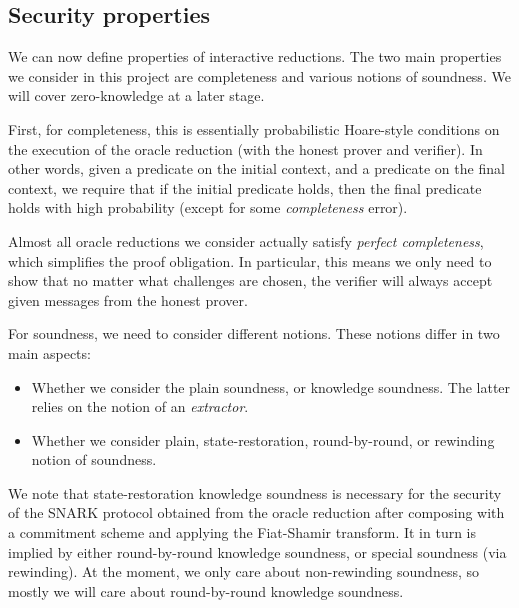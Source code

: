 \subsection{Security properties}

We can now define properties of interactive reductions. The two main properties we consider in this
project are completeness and various notions of soundness. We will cover zero-knowledge at a later
stage.

First, for completeness, this is essentially probabilistic Hoare-style conditions on the execution
of the oracle reduction (with the honest prover and verifier). In other words, given a predicate on
the initial context, and a predicate on the final context, we require that if the initial predicate
holds, then the final predicate holds with high probability (except for some \emph{completeness}
error).

\begin{definition}[Completeness]
    \label{def:completeness}
\end{definition}

Almost all oracle reductions we consider actually satisfy \emph{perfect completeness}, which
simplifies the proof obligation. In particular, this means we only need to show that no matter what challenges are chosen, the verifier will always accept given messages from the honest prover.

For soundness, we need to consider different notions. These notions differ in two main aspects:
\begin{itemize}
    \item Whether we consider the plain soundness, or knowledge soundness. The latter relies on the
    notion of an \emph{extractor}.
    \item Whether we consider plain, state-restoration, round-by-round, or rewinding notion of
    soundness.
\end{itemize}

We note that state-restoration knowledge soundness is necessary for the security of the SNARK
protocol obtained from the oracle reduction after composing with a commitment scheme and applying
the Fiat-Shamir transform. It in turn is implied by either round-by-round knowledge soundness, or
special soundness (via rewinding). At the moment, we only care about non-rewinding soundness, so mostly we will care about round-by-round knowledge soundness.

\begin{definition}[Soundness]
    \label{def:soundness}
\end{definition}

